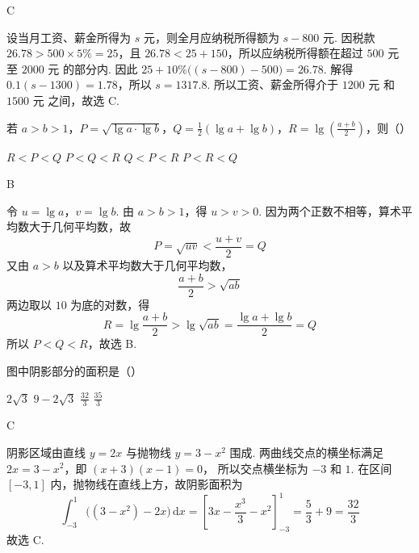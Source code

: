 \begin{answer}
C
\end{answer}

\begin{solution}
设当月工资、薪金所得为 \(s\text{ 元}\)，则全月应纳税所得额为 \(s-800\text{ 元}\). 因税款 \(26.78>500\times5\%=25\)，且
\(26.78<25+150\)，所以应纳税所得额在超过 \(500\text{ 元}\) 至 \(2000\text{ 元}\) 的部分内. 因此
\(25+10\%\bigl((s-800)-500\bigr)=26.78\).
解得
\(0.1(s-1300)=1.78\)，所以 \(s=1317.8\).
所以工资、薪金所得介于 \(1200\text{ 元}\) 和 \(1500\text{ 元}\) 之间，故选 C.
\end{solution}

\begin{problem}
若 \(a > b > 1\)，\(P = \sqrt{\lg a \cdot \lg b}\)，\(Q = \frac{1}{2} (\lg a + \lg b)\)，\(R = \lg \left(\frac{a + b}{2}\right)\)，则（\quad）

\choices
    {\(R < P < Q\)}
    {\(P < Q < R\)}
    {\(Q < P < R\)}
    {\(P < R < Q\)}
\end{problem}

\begin{answer}
B
\end{answer}

\begin{solution}
令 \(u=\lg a\)，\(v=\lg b\). 由 \(a>b>1\)，得 \(u>v>0\). 因为两个正数不相等，算术平均数大于几何平均数，故
\[
P=\sqrt{uv}<\frac{u+v}{2}=Q
\]
又由 \(a>b\) 以及算术平均数大于几何平均数，
\[
\frac{a+b}{2}>\sqrt{ab}
\]
两边取以 \(10\) 为底的对数，得
\[
R=\lg\frac{a+b}{2}>\lg\sqrt{ab}=\frac{\lg a+\lg b}{2}=Q
\]
所以 \(P<Q<R\)，故选 B.
\end{solution}

\begin{problem}
图中阴影部分的面积是（\quad）


\choices
    {\(2\sqrt{3}\)}
    {\(9 - 2\sqrt{3}\)}
    {\(\frac{32}{3}\)}
    {\(\frac{35}{3}\)}
\end{problem}

\begin{answer}
C
\end{answer}

\begin{solution}
阴影区域由直线 \(y=2x\) 与抛物线 \(y=3-x^{2}\) 围成. 两曲线交点的横坐标满足 \(2x=3-x^{2}\)，即 \((x+3)(x-1)=0\)，
所以交点横坐标为 \(-3\) 和 \(1\). 在区间 \([-3,1]\) 内，抛物线在直线上方，故阴影面积为
\[
\int_{-3}^{1}\bigl((3-x^{2})-2x\bigr)\,\mathrm{d}x
=\left[3x-\frac{x^{3}}{3}-x^{2}\right]_{-3}^{1}
=\frac{5}{3}+9=\frac{32}{3}
\]
故选 C.
\end{solution}

